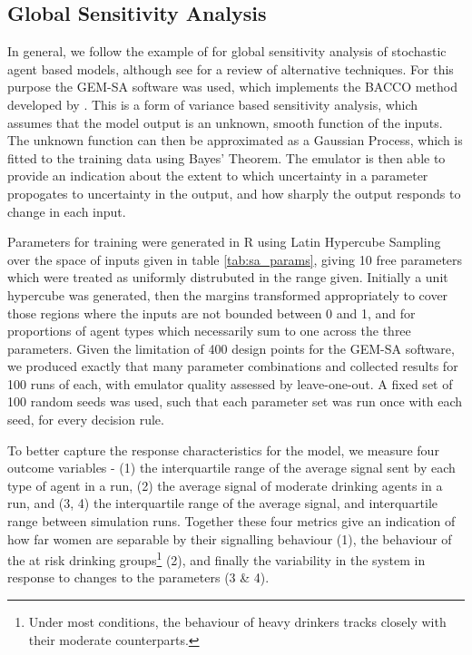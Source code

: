 \subsection{Global Sensitivity Analysis}
\label{sub:sensitivity}
In general, we follow the example of \cite{Bijak2013b} for global sensitivity analysis of stochastic agent based models, although see \citet{Thiele2014} for a review of alternative techniques. For this purpose the \ac{GEM-SA} software \citep{Kennedy} was used, which implements the \ac{BACCO} method developed by \citeauthor{Oakley2004} \citep{Oakley2002,Oakley2004,Dorresteijn2010}. This is a form of variance based sensitivity analysis, which assumes that the model output is an unknown, smooth function of the inputs. The unknown function can then be approximated as a Gaussian Process, which is fitted to the training data using Bayes' Theorem. The emulator is then able to provide an indication about the extent to which uncertainty in a parameter propogates to uncertainty in the output, and how sharply the output responds to change in each input.

\begin{comment}

Justification for doing SA, point out the wide variety of places this gets used. Talk about uncertainty, briefly raise model discrepancy.

\end{comment}

Parameters for training were generated in R \citep{RTeam2014} using Latin Hypercube Sampling \citep{Carnell2012} over the space of inputs given in table \ref{tab:sa_params}, giving 10 free parameters which were treated as uniformly distrubuted in the range given. Initially a unit hypercube was generated, then the margins transformed appropriately to cover those regions where the inputs are not bounded between 0 and 1, and for proportions of agent types which necessarily sum to one across the three parameters. Given the limitation of 400 design points for the \ac{GEM-SA} software, we produced exactly that many parameter combinations and collected results for 100 runs of each, with emulator quality assessed by leave-one-out. A fixed set of 100 random seeds was used, such that each parameter set was run once with each seed, for every decision rule.

To better capture the response characteristics for the model, we measure four outcome variables - (1) the interquartile range of the average signal sent by each type of agent in a run, (2) the average signal of moderate drinking agents in a run, and (3, 4) the interquartile range of the average signal, and interquartile range between simulation runs. Together these four metrics give an indication of how far women are separable by their signalling behaviour (1), the behaviour of the at risk drinking groups\footnote{Under most conditions, the behaviour of heavy drinkers tracks closely with their moderate counterparts.} (2), and finally the variability in the system in response to changes to the parameters (3 \& 4).

